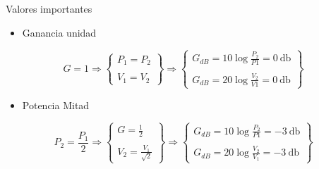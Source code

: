 \documentclass[aspectratio=169, usenames,svgnames,dvipsnames]{beamer}
\begin{document}
\begin{frame}[label={sec:orgf2617d1}]{Valores importantes}
\begin{itemize}
\item Ganancia unidad
\end{itemize}

\[
  G = 1 \Rightarrow
  \left\{
  \begin{array}{c}
    P_1 = P_2\\
    \\
    V_1 = V_2
  \end{array}
  \right\}
  \Rightarrow
  \left\{
  \begin{array}{c}
    G_{dB} = 10 \log \frac{P_2}{P1} = \SI{0}{\decibel}\\
    \\
    G_{dB} = 20 \log \frac{V_2}{V1} = \SI{0}{\decibel}
  \end{array}
  \right\}
\]

\begin{itemize}
\item Potencia Mitad
\end{itemize}

\[
  P_2 = \frac{P_1}{2} \Rightarrow
  \left\{
  \begin{array}{c}
    G = \frac{1}{2}\\
    \\
    V_2 = \frac{V_1}{\sqrt{2}}
  \end{array}
  \right\}
  \Rightarrow
  \left\{
  \begin{array}{c}
    G_{dB} = 10 \log \frac{P_2}{P1} = -\SI{3}{\decibel}\\
    \\
    G_{dB} = 20 \log \frac{V_2}{V_1} = -\SI{3}{\decibel}
  \end{array}
  \right\}
\]
\end{frame}
\end{document}
